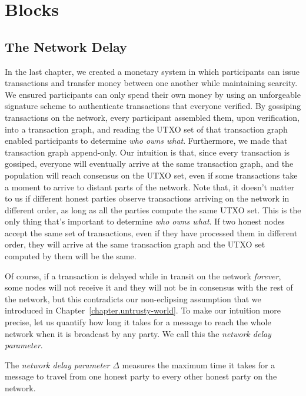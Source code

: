 \chapter{Blocks}\label{chapter.blocks}

\section{The Network Delay}

In the last chapter, we created a monetary system in which participants can issue transactions
and transfer money between one another while maintaining scarcity. We ensured participants can
only spend their own money by using an unforgeable signature scheme to authenticate transactions
that everyone verified. By gossiping transactions on the network, every participant assembled
them, upon verification, into a transaction graph, and reading the UTXO set of that transaction
graph enabled participants to determine \emph{who owns what}.
Furthermore, we made that transaction graph append-only. Our intuition is that, since every
transaction is gossiped, everyone will eventually arrive at the same transaction graph,
and the population will reach consensus on the UTXO set, even if some transactions take
a moment to arrive to distant parts of the network. Note that, it doesn't matter to us if
different honest parties observe transactions arriving on the network in different order,
as long as all the parties compute the same UTXO set. This is the only thing that's important
to determine \emph{who owns what}. If two honest nodes accept the same set of transactions,
even if they have processed them in different order, they will arrive at the same transaction
graph and the UTXO set computed by them will be the same.

Of course, if a transaction is delayed while in transit on the network \emph{forever}, some nodes
will not receive it and they will not be in consensus with the rest of the network, but this
contradicts our non-eclipsing assumption that we introduced in
Chapter~\ref{chapter.untrusty-world}. To make our intuition more precise, let us quantify how
long it takes for a message to reach the whole network when it is broadcast by any party.
We call this the \emph{network delay parameter}.

\begin{definition}
  The \emph{network delay parameter} $\Delta$ measures the maximum time it takes
  for a message to travel from one honest party to every other honest party on the
  network.
\end{definition}

